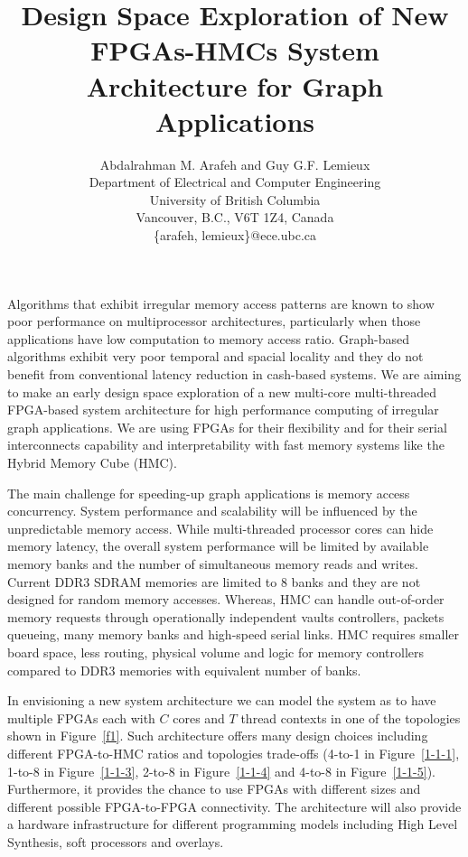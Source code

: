 \documentclass[11pt,twocolumn]{article}
\begin{document}
\title{\textbf{Design Space Exploration of New FPGAs-HMCs System Architecture for Graph Applications}}

\author{\large Abdalrahman M. Arafeh and Guy G.F. Lemieux \\
Department of Electrical and Computer Engineering\\
University of British Columbia \\ Vancouver, B.C., V6T 1Z4, Canada \\
\{arafeh, lemieux\}@ece.ubc.ca}

\date{\vspace{-4ex}}


\maketitle

Algorithms that exhibit irregular memory access patterns are known
to show poor performance on multiprocessor architectures,
particularly when those applications have low computation to
memory access ratio. Graph-based algorithms exhibit very poor
temporal and spacial locality and they do not benefit from
conventional latency reduction in cash-based systems. We are
aiming to make an early design space exploration of a new
multi-core multi-threaded FPGA-based system architecture for high
performance computing of irregular graph applications. We are
using FPGAs for their flexibility and for their serial
interconnects capability and interpretability with fast memory
systems like the Hybrid Memory Cube (HMC).

The main challenge for speeding-up graph applications is memory
access concurrency. System performance and scalability will be
influenced by the unpredictable memory access. While
multi-threaded processor cores can hide memory latency, the
overall system performance will be limited by available memory
banks and the number of simultaneous memory reads and writes.
Current DDR3 SDRAM memories are limited to 8 banks and they are
not designed for random memory accesses. Whereas, HMC can handle
out-of-order memory requests through operationally independent
vaults controllers, packets queueing, many memory banks and
high-speed serial links. HMC requires smaller board space, less
routing, physical volume and logic for memory controllers compared
to DDR3 memories with equivalent number of banks.

In envisioning a new system architecture we can model the system
as to have multiple FPGAs each with $C$ cores and $T$ thread
contexts in one of the topologies shown in Figure~\ref{f1}. Such
architecture offers many design choices including different
FPGA-to-HMC ratios and topologies trade-offs (4-to-1 in
Figure~\ref{1-1-1}, 1-to-8 in Figure~\ref{1-1-3}, 2-to-8 in
Figure~\ref{1-1-4} and 4-to-8 in Figure~\ref{1-1-5}). Furthermore,
it provides the chance to use FPGAs with different sizes and
different possible FPGA-to-FPGA connectivity. The architecture
will also provide a hardware infrastructure for different
programming models including High Level Synthesis, soft processors
and overlays.
\end{document}
